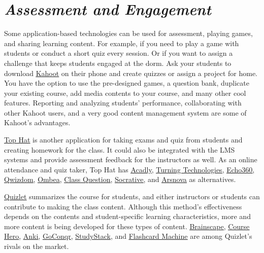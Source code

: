 \documentclass{book}
\begin{document}
\hypertarget{assessment-and-engagement}{%
\section{\texorpdfstring{\emph{Assessment and
Engagement}}{Assessment and Engagement}}\label{assessment-and-engagement}}

Some application-based technologies can be used for assessment, playing games,
and sharing learning content. For example, if you need to play a game with
students or conduct a short quiz every session. Or if you want to assign a
challenge that keeps students engaged at the dorm. Ask your students to
download \href{https://kahoot.com/}{\underline{Kahoot}} on their phone and
create quizzes or assign a project for home. You have the option to use the
pre-designed games, a question bank, duplicate your existing course, add media
contents to your course, and many other cool features. Reporting and analyzing
students' performance, collaborating with other Kahoot users, and a very good
content management system are some of Kahoot's advantages.

\href{https://tophat.com/}{\underline{Top Hat}} is another application for
taking exams and quiz from students and creating homework for the class. It
could also be integrated with the LMS systems and provide assessment feedback
for the instructors as well. As an online attendance and quiz taker, Top Hat
has \href{https://www.acadly.com/}{\underline{Acadly}},
\href{https://www.turningtechnologies.com/}{\underline{Turning Technologies}},
\href{https://echo360.com/}{\underline{Echo360}},
\href{https://qwizdom.com/}{\underline{Qwizdom}},
\href{https://www.ombea.com/}{\underline{Ombea}},
\href{https://classquestion.com/}{\underline{Class Question}},
\href{https://socrative.com/}{\underline{Socrative}}, and
\href{https://arsnova.eu/mobile/}{\underline{Arsnova}} as alternatives.

\href{https://quizlet.com/}{\underline{Quizlet}} summarizes the course for
students, and either instructors or students can contribute to making the
class content. Although this method's effectiveness depends on the contents
and student-specific learning characteristics, more and more content is being
developed for these types of content.
\href{https://www.brainscape.com/}{\underline{Brainscape}},
\href{https://www.coursehero.com/}{\underline{Course Hero}},
\href{https://ankiweb.net/}{\underline{Anki}},
\href{https://www.goconqr.com/}{\underline{GoConqr}},
\href{https://www.studystack.com/}{\underline{StudyStack}}, and
\href{https://www.flashcardmachine.com/}{\underline{Flashcard Machine}} are
among Quizlet's rivals on the market.
\end{document}
